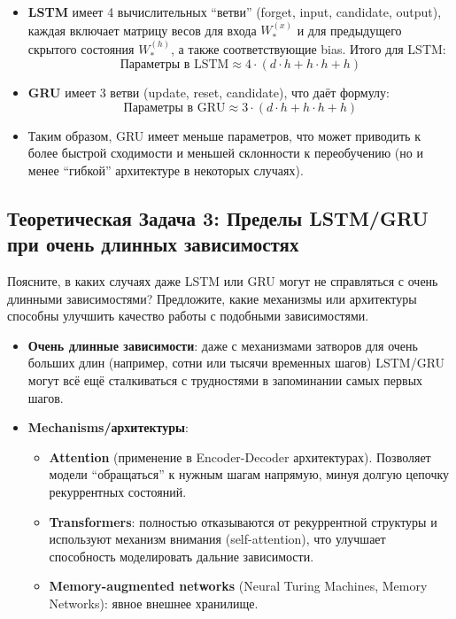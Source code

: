 \begin{itemize}
	\item \textbf{LSTM} имеет 4 вычислительных ``ветви'' (forget, input, candidate, output), каждая включает матрицу весов для входа $W_{*}^{(x)}$ и для предыдущего скрытого состояния $W_{*}^{(h)}$, а также соответствующие bias. Итого для LSTM:
	      \[
		      \text{Параметры в LSTM} \approx 4 \cdot (d \cdot h + h \cdot h + h)
	      \]
	\item \textbf{GRU} имеет 3 ветви (update, reset, candidate), что даёт формулу:
	      \[
		      \text{Параметры в GRU} \approx 3 \cdot (d \cdot h + h \cdot h + h)
	      \]
	\item Таким образом, GRU имеет меньше параметров, что может приводить к более быстрой сходимости и меньшей склонности к переобучению (но и менее ``гибкой'' архитектуре в некоторых случаях).
\end{itemize}

\subsection{Теоретическая Задача 3: Пределы LSTM/GRU при очень длинных зависимостях}

Поясните, в каких случаях даже LSTM или GRU могут не справляться с очень длинными зависимостями? Предложите, какие механизмы или архитектуры способны улучшить качество работы с подобными зависимостями.

\begin{itemize}
	\item \textbf{Очень длинные зависимости}: даже с механизмами затворов для очень больших длин (например, сотни или тысячи временных шагов) LSTM/GRU могут всё ещё сталкиваться с трудностями в запоминании самых первых шагов.
	\item \textbf{Mechanisms/архитектуры}:
	      \begin{itemize}
		      \item \textbf{Attention} (применение в Encoder-Decoder архитектурах). Позволяет модели ``обращаться'' к нужным шагам напрямую, минуя долгую цепочку рекуррентных состояний.
		      \item \textbf{Transformers}: полностью отказываются от рекуррентной структуры и используют механизм внимания (self-attention), что улучшает способность моделировать дальние зависимости.
		      \item \textbf{Memory-augmented networks} (Neural Turing Machines, Memory Networks): явное внешнее хранилище.
	      \end{itemize}
\end{itemize}

